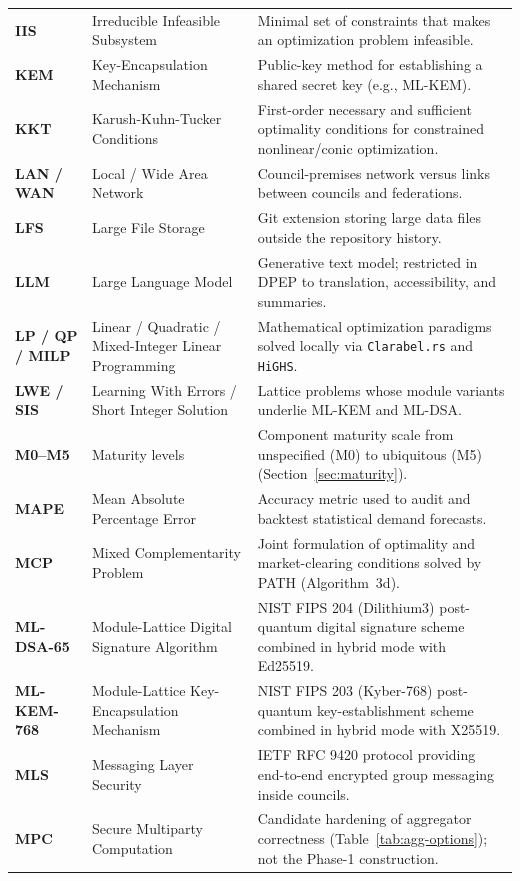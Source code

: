 \documentclass[10pt,twoside,openany]{book}
\theoremstyle{dpepstyle}
\begin{document}
{\begin{longtable}{L{0.92in} L{1.75in} L{1.95in}}
\textbf{IIS} & Irreducible Infeasible Subsystem & Minimal set of constraints that makes an optimization problem infeasible. \\
\textbf{KEM} & Key-Encapsulation Mechanism & Public-key method for establishing a shared secret key (e.g., ML-KEM). \\
\textbf{KKT} & Karush-Kuhn-Tucker Conditions & First-order necessary and sufficient optimality conditions for constrained nonlinear/conic optimization. \\
\textbf{LAN / WAN} & Local / Wide Area Network & Council-premises network versus links between councils and federations. \\
\textbf{LFS} & Large File Storage & Git extension storing large data files outside the repository history. \\
\textbf{LLM} & Large Language Model & Generative text model; restricted in DPEP to translation, accessibility, and summaries. \\
\textbf{LP / QP / MILP} & Linear / Quadratic / Mixed-Integer Linear Programming & Mathematical optimization paradigms solved locally via \texttt{Clarabel.rs} and \texttt{HiGHS}. \\
\textbf{LWE / SIS} & Learning With Errors / Short Integer Solution & Lattice problems whose module variants underlie ML-KEM and ML-DSA. \\
\textbf{M0--M5} & Maturity levels & Component maturity scale from unspecified (M0) to ubiquitous (M5) (Section~\ref{sec:maturity}). \\
\textbf{MAPE} & Mean Absolute Percentage Error & Accuracy metric used to audit and backtest statistical demand forecasts. \\
\textbf{MCP} & Mixed Complementarity Problem & Joint formulation of optimality and market-clearing conditions solved by PATH (Algorithm~3d). \\
\textbf{ML-DSA-65} & Module-Lattice Digital Signature Algorithm & NIST FIPS 204 (Dilithium3) post-quantum digital signature scheme combined in hybrid mode with Ed25519. \\
\textbf{ML-KEM-768} & Module-Lattice Key-Encapsulation Mechanism & NIST FIPS 203 (Kyber-768) post-quantum key-establishment scheme combined in hybrid mode with X25519. \\
\textbf{MLS} & Messaging Layer Security & IETF RFC 9420 protocol providing end-to-end encrypted group messaging inside councils. \\
\textbf{MPC} & Secure Multiparty Computation & Candidate hardening of aggregator correctness (Table~\ref{tab:agg-options}); not the Phase-1 construction. \\

\end{longtable}}
\end{document}
